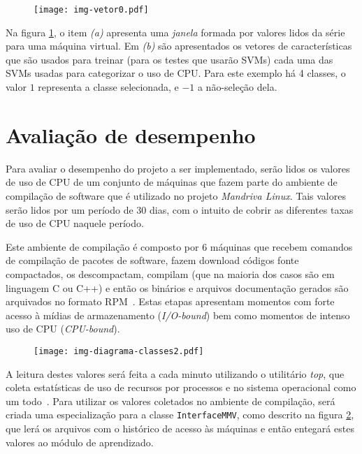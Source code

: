 \begin{figure}[htp]
\centering
\texttt{[image: img-vetor0.pdf]}
\label{fig:vetor0}
\end{figure}

Na figura \ref{fig:vetor0}, o item \emph{(a)} apresenta uma \emph{janela}
formada por valores lidos da série para uma máquina virtual. Em \emph{(b)}
são apresentados os vetores de características que são usados para treinar
(para os testes que usarão SVMs) cada uma das SVMs usadas para categorizar
o uso de CPU. Para este exemplo há 4 classes, o valor $1$ representa a
classe selecionada, e $-1$ a não-seleção dela.

\section{Avaliação de desempenho}\label{sec:desemp}


Para avaliar o desempenho do projeto a ser implementado, serão lidos os
valores de uso de CPU de um conjunto de máquinas que fazem parte do
ambiente de compilação de software que é utilizado no projeto
\emph{Mandriva Linux}. Tais valores serão lidos por um período de 30 dias,
com o intuito de cobrir as diferentes taxas de uso de CPU naquele período.

Este ambiente de compilação é composto por $6$ máquinas que recebem
comandos de compilação de pacotes de software, fazem download códigos fonte
compactados, os descompactam, compilam (que na maioria dos casos são em
linguagem C ou C++) e então os binários e arquivos documentação gerados são
arquivados no formato RPM~\cite{ewing1996rpm}. Estas etapas apresentam
momentos com forte acesso à mídias de armazenamento (\emph{I/O-bound}) bem
como momentos de intenso uso de CPU (\emph{CPU-bound}).

\begin{figure}[htp]
\centering
\texttt{[image: img-diagrama-classes2.pdf]}
\label{fig:diagramaclasses2}
\end{figure}

A leitura destes valores será feita a cada minuto utilizando o utilitário
\emph{top}, que coleta estatísticas de uso de recursos por processos e no
sistema operacional como um todo~\cite{andresen2004monitoring}. Para utilizar
os valores coletados no ambiente de compilação, será criada uma especialização
para a classe \texttt{InterfaceMMV}, como descrito na figura
\ref{fig:diagramaclasses2}, que lerá os arquivos com o histórico de acesso às
máquinas e então entegará estes valores ao módulo de aprendizado.

